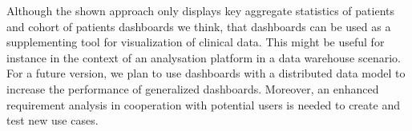 \documentclass[aac,crcready]{iosart2x}
\begin{document}
Although the shown approach only displays key aggregate statistics of patients and cohort of patients dashboards we think, that dashboards can be used as a supplementing tool for visualization of clinical data. This might be useful for instance in the context of an analysation platform in a data warehouse scenario. For a future version, we plan to use dashboards with a distributed data model to increase the performance of generalized dashboards. Moreover, an enhanced requirement analysis in cooperation with potential users is needed to create and test new use cases.







\end{document}
